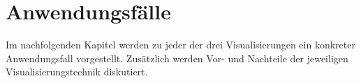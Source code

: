 \documentclass[usegeometry=true]{scrartcl}
\begin{document}
\section{Anwendungsfälle}

Im nachfolgenden Kapitel werden zu jeder der drei Visualisierungen ein konkreter Anwendungsfall vorgestellt. Zusätzlich werden Vor- und Nachteile der jeweiligen Visualisierungstechnik diskutiert.

\end{document}
